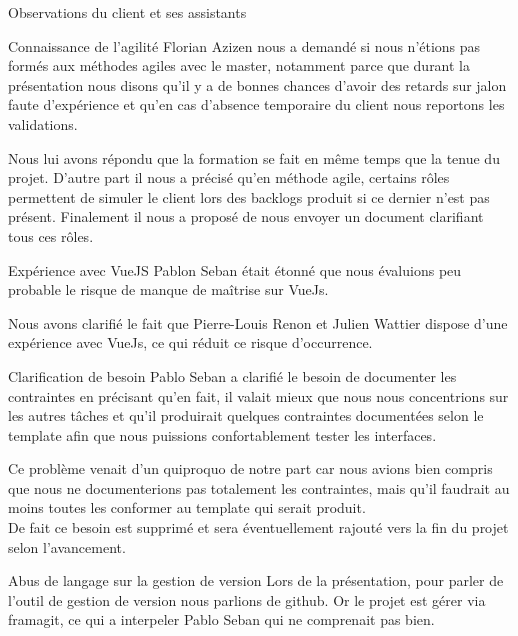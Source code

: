 \documentclass[]{article}
\begin{document}
    \begin{section}{Observations du client et ses assistants}
        \begin{subsection}{Connaissance de l'agilité}
            Florian Azizen nous a demandé si nous n'étions pas formés aux méthodes agiles avec le master, notamment parce que 
            durant la présentation nous disons qu'il y a de bonnes chances d'avoir des retards sur jalon faute d'expérience et 
            qu'en cas d'absence temporaire du client nous reportons les validations.

            Nous lui avons répondu que la formation se fait en même temps que la tenue du projet. D'autre part il nous a précisé 
            qu'en méthode agile, certains rôles permettent de simuler le client lors des backlogs produit si ce dernier n'est pas 
            présent. Finalement il nous a proposé de nous envoyer un document clarifiant tous ces rôles.
        \end{subsection}
        
        \begin{subsection}{Expérience avec VueJS}
            Pablon Seban était étonné que nous évaluions peu probable le risque de manque de maîtrise sur VueJs.

            Nous avons clarifié le fait que Pierre-Louis Renon et Julien Wattier dispose d'une expérience avec VueJs, ce qui 
            réduit ce risque d'occurrence.
        \end{subsection}

        \begin{subsection}{Clarification de besoin}
            Pablo Seban a clarifié le besoin de documenter les contraintes en précisant qu'en fait, il valait mieux que nous 
            nous concentrions sur les autres tâches et qu'il produirait quelques contraintes documentées selon le template afin 
            que nous puissions confortablement tester les interfaces.

            Ce problème venait d'un quiproquo de notre part car nous avions bien compris que nous ne documenterions pas 
            totalement les contraintes, mais qu'il faudrait au moins toutes les conformer au template qui serait produit.\\
            De fait ce besoin est supprimé et sera éventuellement rajouté vers la fin du projet selon l'avancement.
        \end{subsection}

        \begin{subsection}{Abus de langage sur la gestion de version}
            Lors de la présentation, pour parler de l'outil de gestion de version nous parlions de github. Or le projet est 
            gérer via framagit, ce qui a interpeler Pablo Seban qui ne comprenait pas bien.


\end{subsection}
\end{section}
\end{document}
